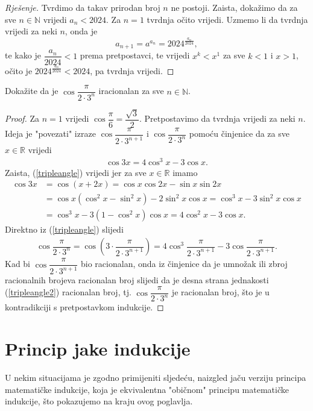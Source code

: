 \begin{proof}[Rješenje]
Tvrdimo da takav prirodan broj $n$ ne postoji. Zaista, dokažimo da za sve $n\in \mathbb{N}$ vrijedi $a_n<2024$. Za $n=1$ tvrdnja očito vrijedi. Uzmemo li da tvrdnja vrijedi za neki $n$, onda je $$a_{n+1}=a^{a_n}=2024^{\frac{a_n}{2024}},$$ 
te kako je $\dfrac{a_n}{2024}<1$ prema pretpostavci, te vrijedi $x^k<x^1$ za sve $k<1$ i $x>1$, očito je $2024^{\frac{a_n}{2024}}<2024$, pa tvrdnja vrijedi.
\end{proof}
\begin{exercise} Dokažite da je $\cos{\dfrac{\pi}{2\cdot 3^n}}$ iracionalan za sve $n\in \mathbb{N}$.
\end{exercise}
\begin{proof}
Za $n=1$ vrijedi $\cos{\dfrac{\pi}{6}}=\dfrac{\sqrt{3}}{2}$. Pretpostavimo da tvrdnja vrijedi za neki $n$. Ideja je "povezati" izraze $\cos{\dfrac{\pi}{2\cdot 3^{n+1}}}$ i $\cos{\dfrac{\pi}{2\cdot 3^{n}}}$ pomoću činjenice da za sve $x\in \mathbb{R}$ vrijedi
\begin{align}
\label{tripleangle}
\cos{3x}=4\cos^3{x}-3\cos{x}.
\end{align}
Zaista, (\ref{tripleangle}) vrijedi jer za sve $x\in \mathbb{R}$ imamo
\begin{align*}
\cos{3x}&=\cos(x+2x)=\cos{x}\cos{2x}-\sin{x}\sin{2x}\\
&=\cos{x}\left(\cos^2{x}-\sin^2{x}\right)-2\sin^2{x}\cos{x}=\cos^3{x}-3\sin^2{x}\cos{x}\\
&=\cos^3x-3(1-\cos^2{x})\cos{x}=4\cos^2{x}-3\cos{x}.
\end{align*}
Direktno iz (\ref{tripleangle}) slijedi
\begin{align}
\label{tripleangle2}
\cos{\dfrac{\pi}{2\cdot 3^{n}}}=\cos\left(3\cdot \dfrac{\pi}{2\cdot 3^{n+1}}\right)=4\cos^3{\dfrac{\pi}{2\cdot 3^{n+1}}}-3\cos{\dfrac{\pi}{2\cdot 3^{n+1}}}.
\end{align}
Kad bi $\cos{\dfrac{\pi}{2\cdot 3^{n+1}}}$ bio racionalan, onda iz činjenice da je umnožak ili zbroj racionalnih brojeva racionalan broj slijedi da je desna strana jednakosti (\ref{tripleangle2}) racionalan broj, tj. $\cos{\dfrac{\pi}{2\cdot 3^{n}}}$ je racionalan broj, što je u kontradikciji s pretpostavkom indukcije.
\end{proof}
\section{Princip jake indukcije}
U nekim situacijama je zgodno primijeniti sljedeću, naizgled jaču verziju principa matematičke indukcije, koja je ekvivalentna "običnom" principu matematičke indukcije, što pokazujemo na kraju ovog poglavlja.

